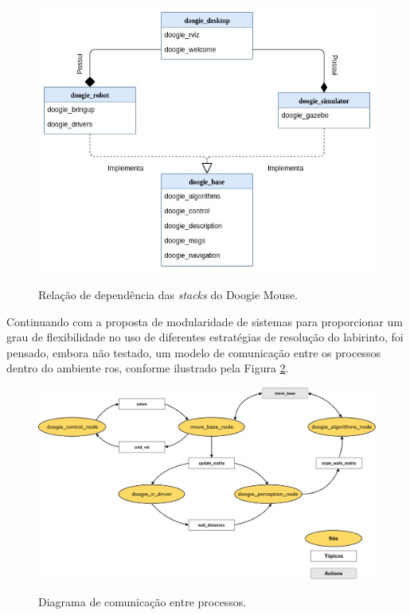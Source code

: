 \begin{figure}[H]
	\centering
	\caption{Relação de dependência das \textit{stacks} do Doogie Mouse.}
	\includegraphics[width=1\textwidth]
	{Figures/diagrama_dos_pacotes}
	\label{fig:diagrama_dos_pacotes}
\end{figure}

Continuando com a proposta de modularidade de sistemas para proporcionar um grau de flexibilidade no uso de diferentes estratégias de resolução do labirinto, foi pensado, embora não testado, um modelo de comunicação entre os processos dentro do ambiente \gls*{ros}, conforme ilustrado pela Figura \ref{fig:doogie_ros_graph}.

\begin{figure}[H]
	\centering
	\caption{Diagrama de comunicação entre processos.}
	\includegraphics[width=1\textwidth]
	{Figures/doogie_ros_graph}
	\label{fig:doogie_ros_graph}
\end{figure}

